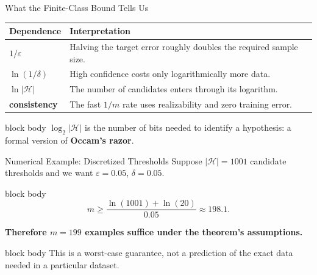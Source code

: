 \documentclass[aspectratio=169,10pt]{beamer}
\newcommand{\Hc}{\mathcal{H}}
\newcommand{\eps}{\varepsilon}
\begin{document}
\begin{frame}[t]{What the Finite-Class Bound Tells Us}
  \vspace{0.04cm}
  \renewcommand{\arraystretch}{1.28}
  \begin{center}
  \small
  \begin{tabular}{>{\bfseries}p{} p{}}
    \toprule
    Dependence & Interpretation \\
    \midrule
    $1/\eps$ & Halving the target error roughly doubles the required sample size. \\
    $\ln(1/\delta)$ & High confidence costs only logarithmically more data. \\
    $\ln|\Hc|$ & The number of candidates enters through its logarithm. \\
    consistency & The fast $1/m$ rate uses realizability and zero training error. \\
    \bottomrule
  \end{tabular}
  \end{center}
  \vspace{0.16cm}
  \begin{beamercolorbox}[rounded=true,sep=0.16cm,wd=0.94\linewidth,center]{block body}
    $\log_2|\Hc|$ is the number of bits needed to identify a hypothesis: a formal version of \textbf{Occam's razor}.
  \end{beamercolorbox}
\end{frame}

\begin{frame}[t]{Numerical Example: Discretized Thresholds}
  \vspace{0.05cm}
  Suppose $|\Hc|=1001$ candidate thresholds and we want $\eps=0.05$, $\delta=0.05$.
  \vspace{0.12cm}
  \begin{beamercolorbox}[rounded=true,sep=0.20cm,wd=0.86\linewidth,center]{block body}
    \[
      m\ge
      \frac{\ln(1001)+\ln(20)}{0.05}
      \approx 198.1.
    \]
  \end{beamercolorbox}
  \vspace{0.20cm}
  \centering
  {\fontsize{18}{22}\selectfont\bfseries Therefore $m=199$ examples suffice under the theorem's assumptions.}
  \vspace{0.10cm}
  \begin{beamercolorbox}[rounded=true,sep=0.10cm,wd=0.88\linewidth,center]{block body}
    This is a worst-case guarantee, not a prediction of the exact data needed in a particular dataset.
  \end{beamercolorbox}
\end{frame}
\end{document}
